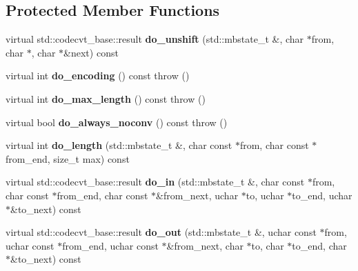 \subsection*{Protected Member Functions}
\begin{DoxyCompactItemize}
\item 
virtual std\+::codecvt\+\_\+base\+::result {\bfseries do\+\_\+unshift} (std\+::mbstate\+\_\+t \&, char $\ast$from, char $\ast$, char $\ast$\&next) const \label{classbooster_1_1locale_1_1generic__codecvt_3_01CharType_00_01CodecvtImpl_00_014_01_4_add4e987d2099dd2a8e05fe7574ba65d9}

\item 
virtual int {\bfseries do\+\_\+encoding} () const   throw ()\label{classbooster_1_1locale_1_1generic__codecvt_3_01CharType_00_01CodecvtImpl_00_014_01_4_aba4178c455c4bcc62433d94629a266fd}

\item 
virtual int {\bfseries do\+\_\+max\+\_\+length} () const   throw ()\label{classbooster_1_1locale_1_1generic__codecvt_3_01CharType_00_01CodecvtImpl_00_014_01_4_a0227e40c0c81c71742a957d7196cf88b}

\item 
virtual bool {\bfseries do\+\_\+always\+\_\+noconv} () const   throw ()\label{classbooster_1_1locale_1_1generic__codecvt_3_01CharType_00_01CodecvtImpl_00_014_01_4_ae3aac0c764056c527452180b5a30baf0}

\item 
virtual int {\bfseries do\+\_\+length} (std\+::mbstate\+\_\+t \&, char const $\ast$from, char const $\ast$from\+\_\+end, size\+\_\+t max) const \label{classbooster_1_1locale_1_1generic__codecvt_3_01CharType_00_01CodecvtImpl_00_014_01_4_a589035eebecf678715d6ffd4af507ed1}

\item 
virtual std\+::codecvt\+\_\+base\+::result {\bfseries do\+\_\+in} (std\+::mbstate\+\_\+t \&, char const $\ast$from, char const $\ast$from\+\_\+end, char const $\ast$\&from\+\_\+next, uchar $\ast$to, uchar $\ast$to\+\_\+end, uchar $\ast$\&to\+\_\+next) const \label{classbooster_1_1locale_1_1generic__codecvt_3_01CharType_00_01CodecvtImpl_00_014_01_4_a3fc0c5c947d65608b96e6f7b3307f37a}

\item 
virtual std\+::codecvt\+\_\+base\+::result {\bfseries do\+\_\+out} (std\+::mbstate\+\_\+t \&, uchar const $\ast$from, uchar const $\ast$from\+\_\+end, uchar const $\ast$\&from\+\_\+next, char $\ast$to, char $\ast$to\+\_\+end, char $\ast$\&to\+\_\+next) const \label{classbooster_1_1locale_1_1generic__codecvt_3_01CharType_00_01CodecvtImpl_00_014_01_4_af47fee7bb55db2c95a6e0df8ad8d1e8d}

\end{DoxyCompactItemize}


